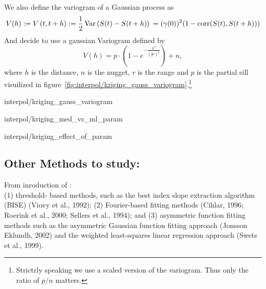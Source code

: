 We also define the variogram of a Gaussian process as
$$V(h):=V\left(t, t+h\right):=\frac{1}{2} \operatorname{Var}\left(S(t)-S(t+h)\right)\\ %
    =(\gamma(0))^2(1-\operatorname{corr}(S(t),S(t+h)))
$$
And decide to use a gaussian Variogram defined by
$$V(h) = p \cdot\left(1-e^{-\frac{h^{2}}{\left(\frac{4}{7} r\right)^{2}}}\right)+n,$$
where $h$ is the distance, $n$ is the nugget, $r$ is the range and $p$ is the partial sill visuilized in figure~\ref{fig:interpol/kriging_gauss_variogram}.\footnote{Strictrly speaking we use a scaled version of the variogram. Thus only the ratio of $p/n$ matters.}
\begin{my_figure}[h]{interpol/kriging_gauss_variogram}
    \caption{Gaussian Variogram with nugget=1, partial sill=3, range=55}
    \label{fig:interpol/kriging_gauss_variogram}
\end{my_figure}

\begin{my_figure}{interpol/kriging_med_vs_ml_param}
\end{my_figure}
\begin{my_figure}{interpol/kriging_effect_of_param}
\end{my_figure}

\subsection{Other Methods to study:}
From inroduction of \cite{chenSimpleMethodReconstructing2004a}:\\
(1) threshold-
based methods, such as the best index slope extraction
algorithm (BISE) (Viovy et al., 1992); (2) Fourier-based
fitting methods (Cihlar, 1996; Roerink et al., 2000; Sellers
et al., 1994); and (3) asymmetric function fitting methods
such as the asymmetric Gaussian function fitting approach
(Jonsson Eklundh, 2002) and the weighted least-squares
linear regression approach (Swets et al., 1999).
